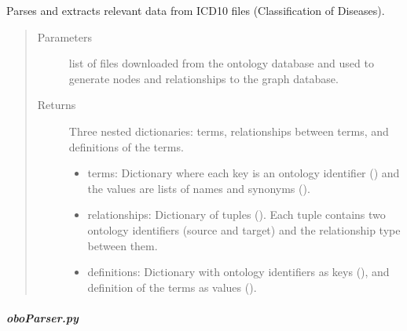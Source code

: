 \documentclass[letterpaper,10pt,english]{sphinxmanual}
\begin{document}
\begin{fulllineitems}
\label{\detokenize{_autosummary/graphdb_builder.ontologies.parsers:graphdb_builder.ontologies.parsers.icdParser.parser}}
Parses and extracts relevant data from ICD\sphinxhyphen{}10 files (Classification of Diseases).
\begin{quote}\begin{description}
\item[{Parameters}] \leavevmode
{} \textendash{} list of files downloaded from the ontology database and used to generate nodes and relationships to the graph database.

\item[{Returns}] \leavevmode

Three nested dictionaries: terms, relationships between terms, and definitions of the terms.
\begin{itemize}
\item {} 
terms: Dictionary where each key is an ontology identifier () and the values are lists of names and synonyms ().

\item {} 
relationships: Dictionary of tuples (). Each tuple contains two ontology identifiers (source and target) and                         the relationship type between them.

\item {} 
definitions: Dictionary with ontology identifiers as keys (), and definition of the terms as values ().

\end{itemize}


\end{description}\end{quote}

\end{fulllineitems}



\subparagraph{oboParser.py}
\label{\detokenize{_autosummary/graphdb_builder.ontologies.parsers:module-graphdb_builder.ontologies.parsers.oboParser}}\label{\detokenize{_autosummary/graphdb_builder.ontologies.parsers:oboparser-py}}
\end{document}
